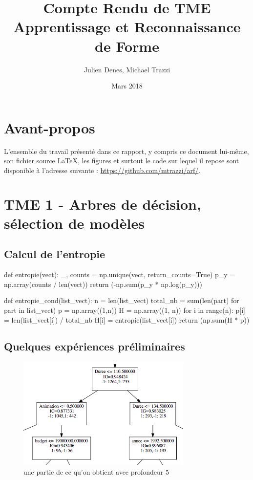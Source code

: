 \documentclass[a4paper]{article}
\title{Compte Rendu de TME \\ Apprentissage et Reconnaissance de Forme}
\author{Julien Denes, Michael Trazzi}
\date{Mars 2018}
\begin{document}
\maketitle

\section*{Avant-propos}

L'ensemble du travail présenté dans ce rapport, y compris ce document lui-même, son fichier source LaTeX, les figures et surtout le code sur lequel il repose sont disponible à l'adresse suivante : \href{https://github.com/mtrazzi/arf/}{https://github.com/mtrazzi/arf/}.



\section*{TME 1 - Arbres de décision, sélection de modèles}

\subsection*{Calcul de l'entropie}
\begin{python}
def entropie(vect):
    _, counts = np.unique(vect, return_counts=True)
    p_y = np.array(counts / len(vect))
    return (-np.sum(p_y * np.log(p_y)))
\end{python}

\begin{python}
def entropie_cond(list_vect):
    n = len(list_vect)
    total_nb = sum(len(part) for part in list_vect)
    p = np.array((1,n))
    H = np.array((1, n))
    for i in range(n):
            p[i] = len(list_vect[i]) / total_nb
            H[i] = entropie(list_vect[i])
    return (np.sum(H * p))
\end{python}

\subsection*{Quelques expériences préliminaires}

\begin{figure}[ht!]
\begin{center}
\includegraphics[scale=0.5]{tree5_part}
\caption{une partie de ce qu'on obtient avec profondeur 5}
\label{profondeur}
\end{center}
\end{figure}
\end{document}
